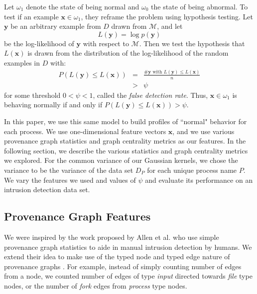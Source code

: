 \documentclass[10pt,twocolumn]{article}
\newcommand{\m}[1]{\mathbf{#1}}
\begin{document}
Let $\omega_1$ denote the state of being normal and $\omega_0$ the state of being abnormal.
To test if an example $\m{x} \in \omega_1$, they reframe the problem using hypothesis testing. Let $\m{y}$ be
an arbitrary example from $D$ drawn from $\mathcal{M}$, and let 
$$L(\m{y}) = \log p(\m{y})$$
be the log-likelihood of $\m{y}$ with respect to $\mathcal{M}$. Then we test the hypothesis that
$L(\m{x})$ is drawn from the distribution of the log-likelihood of the random examples in $D$ with:
\begin{eqnarray*}
P(L(\m{y}) \leq L(\m{x})) 
&=&  \frac{\#\m{y} \mbox { with } L(\m{y}) \leq L(\m{x})}{n} \\
&>& \psi
\end{eqnarray*}
for some threshold $0 < \psi < 1$, called the {\em false detection rate}. 
Thus, $\m{x} \in \omega_1$ is behaving normally if and only if $P(L(\m{y}) \leq L(\m{x})) > \psi$. 

In this paper, we use this same model to build profiles of ``normal" behavior for each process. We use
one-dimensional feature vectors $\m{x}$, and we use various provenance graph statistics and graph
centrality metrics as our features. In the following section, we describe the various statistics and graph centrality metrics we explored. For the common variance of our Gaussian kernels, we chose
the variance to be the variance of the data set $D_P$ for each unique process name $P$. 
We vary the features we used and values of $\psi$ and evaluate its performance on an intrusion detection data set.

\subsection{Provenance Graph Features}

We were inspired by the work proposed by Allen et al. who use simple provenance graph statistics to aide
in manual intrusion detection by humans. We extend their idea to make use of the typed node and typed edge
nature of provenance graphs \cite{provstat}. For example, instead of simply counting number of edges from a node, we
counted number of edges of type {\em input} directed towards {\em file} type nodes, or the number of {\em fork}
edges from {\em process} type nodes.
\end{document}
